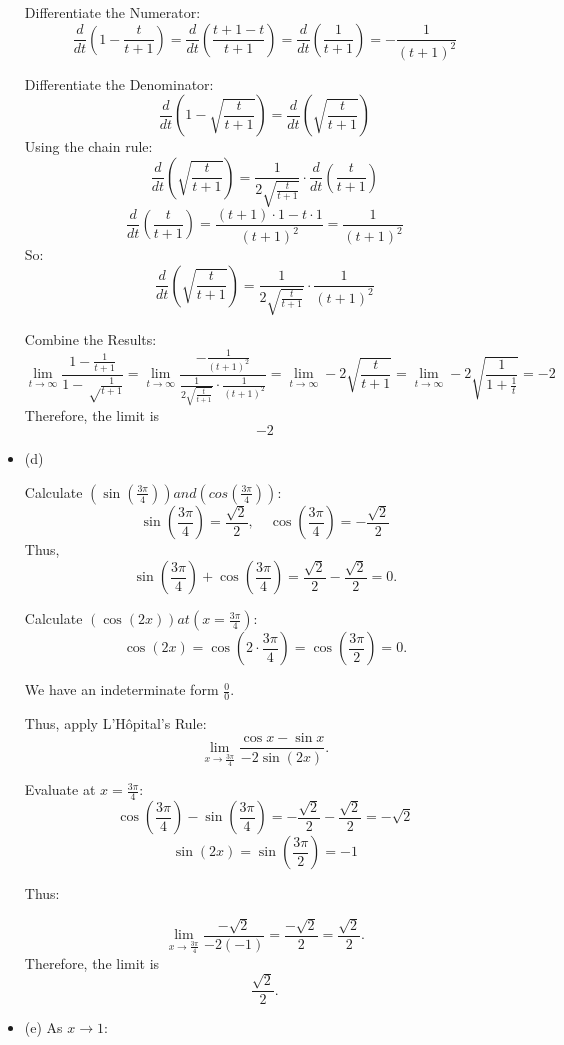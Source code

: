 \documentclass[a4paper, 7pt]{article}
\begin{document}
\begin{itemize}
    Differentiate the Numerator: 
    \[
    \frac{d}{dt} \left(1 - \frac{t}{t+1}\right) = \frac{d}{dt} \left(\frac{t+1 - t}{t+1}\right) = \frac{d}{dt} \left(\frac{1}{t+1}\right) = -\frac{1}{(t+1)^2}
    \]

    Differentiate the Denominator: 
    \[
    \frac{d}{dt} \left(1 - \sqrt{\frac{t}{t+1}}\right) = \frac{d}{dt} \left(\sqrt{\frac{t}{t+1}}\right)
    \]
    Using the chain rule: 
    \[
    \frac{d}{dt} \left(\sqrt{\frac{t}{t+1}}\right) = \frac{1}{2\sqrt{\frac{t}{t+1}}} \cdot \frac{d}{dt} \left(\frac{t}{t+1}\right)
    \]
    \[
    \frac{d}{dt} \left(\frac{t}{t+1}\right)  = \frac{(t+1) \cdot 1 - t \cdot 1}{(t+1)^2} = \frac{1}{(t+1)^2}
    \]
    So: 
    \[
    \frac{d}{dt} \left(\sqrt{\frac{t}{t+1}}\right) = \frac{1}{2\sqrt{\frac{t}{t+1}}} \cdot \frac{1}{(t+1)^2}
    \]

    Combine the Results: 
    \[
    \lim_{t \to \infty} \frac{1-\frac{1}{t + 1}}{1-\sqrt\frac{1}{t+1}} =  \lim_{t \to \infty} \frac{-\frac{1}{(t+1)^2}}{\frac{1}{2\sqrt{\frac{t}{t+1}}} \cdot \frac{1}{(t+1)^2}} =  \lim_{t \to \infty} - 2\sqrt{\frac{t}{t+1}} =  \lim_{t \to \infty} -2\sqrt{\frac{1}{1+\frac{1}{t}}} = -2
    \]
    Therefore, the limit is 
    \[
    -2
    \]
    \item (d)
    
    Calculate $(\sin\left(\frac{3\pi}{4}\right)) and (cos\left(\frac{3\pi}{4}\right))$:
    \[
    \sin\left(\frac{3\pi}{4}\right) = \frac{\sqrt{2}}{2}, \quad \cos\left(\frac{3\pi}{4}\right) = -\frac{\sqrt{2}}{2}
    \]
    Thus,
    \[
    \sin\left(\frac{3\pi}{4}\right) + \cos\left(\frac{3\pi}{4}\right) = \frac{\sqrt{2}}{2} - \frac{\sqrt{2}}{2} = 0.
    \]
    
    Calculate $(\cos(2x)) at ( x = \frac{3\pi}{4} )$:
    \[
    \cos(2x) = \cos\left(2 \cdot \frac{3\pi}{4}\right) = \cos\left(\frac{3\pi}{2}\right) = 0.
    \]
    
    We have an indeterminate form \( \frac{0}{0} \). 

    Thus, apply L'Hôpital's Rule:
    \[
    \lim_{x \to \frac{3\pi}{4}} \frac{\cos x - \sin x}{-2\sin(2x)}.
    \]

    Evaluate at \( x = \frac{3\pi}{4} \):
    \[
    \cos\left(\frac{3\pi}{4}\right) - \sin\left(\frac{3\pi}{4}\right) = -\frac{\sqrt{2}}{2} - \frac{\sqrt{2}}{2} = -\sqrt{2}
    \]
    \[ 
    \sin(2x) = \sin\left(\frac{3\pi}{2}\right) = -1 
    \]
    
    Thus:

    \[
    \lim_{x \to \frac{3\pi}{4}} \frac{-\sqrt{2}}{-2(-1)} = \frac{-\sqrt{2}}{2} = \frac{\sqrt{2}}{2}.
    \]    
    Therefore, the limit is     
    \[
    \frac{\sqrt{2}}{2}.
    \]    
    \item (e)
    As \(x \to 1\):


\end{itemize}
\end{document}
